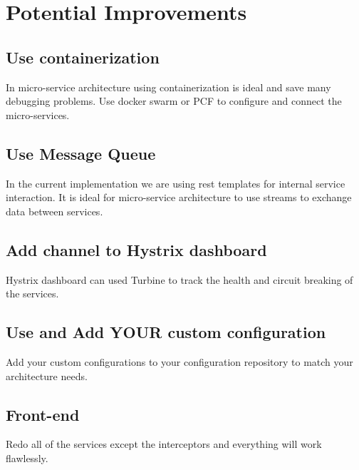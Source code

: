 \chapter{Potential Improvements}
\section{Use containerization}
In micro-service architecture using containerization is ideal and save many debugging problems. Use docker swarm or PCF to configure and connect the micro-services.

\section{Use Message Queue}
In the current implementation we are using rest templates for internal service interaction. It is ideal for micro-service architecture to use streams to exchange data between services.

\section{Add channel to Hystrix dashboard}
Hystrix dashboard can used Turbine to track the health and circuit breaking of the services.

\section{Use and Add YOUR custom configuration}
Add your custom configurations to your configuration repository to match your architecture needs.

\section{Front-end}
Redo all of the services except the interceptors and everything will work flawlessly.